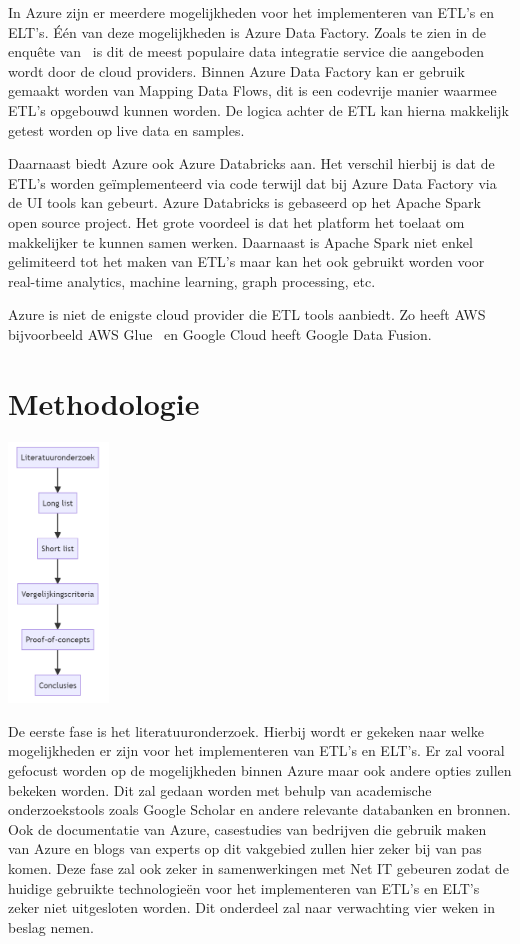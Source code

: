 In Azure zijn er meerdere mogelijkheden voor het implementeren van ETL's en ELT's. Één van deze mogelijkheden is Azure Data Factory. Zoals te zien in de enquête van~\textcite{Sreemathy2021} is dit de meest populaire data integratie service die aangeboden wordt door de cloud providers. Binnen Azure Data Factory kan er gebruik gemaakt worden van Mapping Data Flows, dit is een codevrije manier waarmee ETL's opgebouwd kunnen worden. De logica achter de ETL kan hierna makkelijk getest worden op live data en samples.~\autocite{Kromer2022a} 

Daarnaast biedt Azure ook Azure Databricks aan. Het verschil hierbij is dat de ETL's worden geïmplementeerd via code terwijl dat bij Azure Data Factory via de UI tools kan gebeurt. Azure Databricks is gebaseerd op het Apache Spark open source project. Het grote voordeel is dat het platform het toelaat om makkelijker te kunnen samen werken. Daarnaast is Apache Spark niet enkel gelimiteerd tot het maken van ETL's maar kan het ook gebruikt worden voor real-time analytics, machine learning, graph processing, etc.~\autocite{Etaati2019}

Azure is niet de enigste cloud provider die ETL tools aanbiedt. Zo heeft AWS bijvoorbeeld AWS Glue~\autocite{Khan2024} en Google Cloud heeft Google Data Fusion.~\autocite{Jaiswal2022}

\section{Methodologie}%
\label{sec:methodologie}

\begin{center}
    \includegraphics[width=0.2\textwidth]{graphics/methodologie.png}    
\end{center}

De eerste fase is het literatuuronderzoek. Hierbij wordt er gekeken naar welke mogelijkheden er zijn voor het implementeren van ETL's en ELT's. Er zal vooral gefocust worden op de mogelijkheden binnen Azure maar ook andere opties zullen bekeken worden. Dit zal gedaan worden met behulp van academische onderzoekstools zoals Google Scholar en andere relevante databanken en bronnen. Ook de documentatie van Azure, casestudies van bedrijven die gebruik maken van Azure en blogs van experts op dit vakgebied zullen hier zeker bij van pas komen. Deze fase zal ook zeker in samenwerkingen met Net IT gebeuren zodat de huidige gebruikte technologieën voor het implementeren van ETL's en ELT's zeker niet uitgesloten worden. Dit onderdeel zal naar verwachting vier weken in beslag nemen. 

